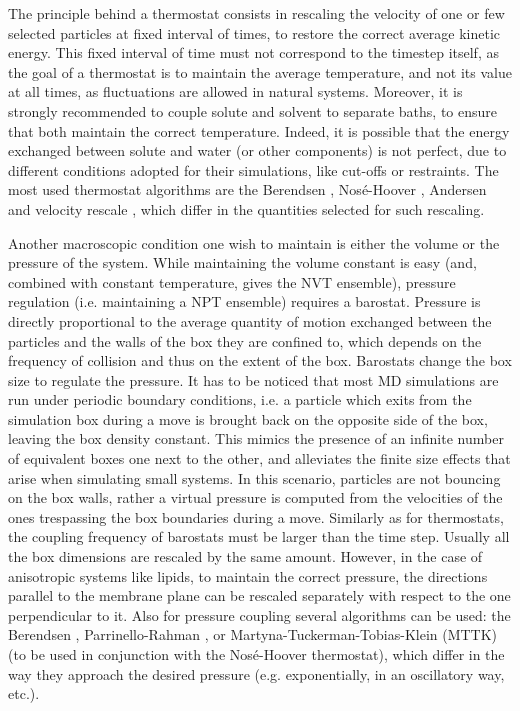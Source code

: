 The principle behind a thermostat consists in rescaling the velocity of one or few selected particles at fixed interval of times, to restore the correct average kinetic energy. This fixed interval of time must not correspond to the timestep itself, as the goal of a thermostat is to maintain the average temperature, and not its value at all times, as fluctuations are allowed in natural systems.
%
Moreover, it is strongly recommended to couple solute and solvent to separate baths, to ensure that both maintain the correct temperature. Indeed, it is possible that the energy exchanged between solute and water (or other components) is not perfect, due to different conditions adopted for their simulations, like cut-offs or restraints.
%
The most used thermostat algorithms are the Berendsen \cite{Berendsen1984}, Nos\'{e}-Hoover \cite{Nose1983,Hoover1985}, Andersen \cite{Andersen1980} and velocity rescale \cite{Bussi2007}, which differ in the quantities selected for such rescaling.

Another macroscopic condition one wish to maintain is either the volume or the pressure of the system. While maintaining the volume constant is easy (and, combined with constant temperature, gives the NVT ensemble), pressure regulation (i.e. maintaining a NPT ensemble) requires a barostat.
%
Pressure is directly proportional to the average quantity of motion exchanged between the particles and the walls of the box they are confined to, which depends on the frequency of collision and thus on the extent of the box. Barostats change the box size to regulate the pressure.
%
It has to be noticed that most MD simulations are run under periodic boundary conditions, i.e. a particle which exits from the simulation box during a move is brought back on the opposite side of the box, leaving the box density constant. This mimics the presence of an infinite number of equivalent boxes one next to the other, and alleviates the finite size effects that arise when simulating small systems.
%
In this scenario, particles are not bouncing on the box walls, rather a virtual pressure is computed from the velocities of the ones trespassing the box boundaries during a move.
%
Similarly as for thermostats, the coupling frequency of barostats must be larger than the time step. Usually all the box dimensions are rescaled by the same amount. However, in the case of anisotropic systems like lipids, to maintain the correct pressure, the directions parallel to the membrane plane can be rescaled separately with respect to the one perpendicular to it.
%
Also for pressure coupling several algorithms can be used: the Berendsen \cite{Berendsen1984}, Parrinello-Rahman \cite{Parrinello1981}, or Martyna-Tuckerman-Tobias-Klein (MTTK) \cite{Martyna1996} (to be used in conjunction with the Nos\'{e}-Hoover thermostat), which differ in the way they approach the desired pressure (e.g. exponentially, in an oscillatory way, etc.).


